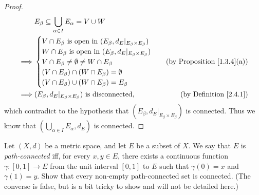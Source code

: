 \begin{proof}
    \begin{align*}
                 & E_\beta \subseteq \bigcup_{\alpha \in I} E_\alpha = V \cup W                                                        \\
        \implies & \begin{cases}
                       V \cap E_\beta \text{ is open in } (E_\beta, d_E|_{E_\beta \times E_\beta}) \\
                       W \cap E_\beta \text{ is open in } (E_\beta, d_E|_{E_\beta \times E_\beta}) \\
                       V \cap E_\beta \neq \emptyset \neq W \cap E_\beta                           \\
                       (V \cap E_\beta) \cap (W \cap E_\beta) = \emptyset                          \\
                       (V \cap E_\beta) \cup (W \cap E_\beta) = E_\beta
                   \end{cases} & \text{(by Proposition \ref{1.3.4}(a))}                                         \\
        \implies & (E_\beta, d_E|_{E_\beta \times E_\beta}) \text{ is disconnected},              & \text{(by Definition \ref{2.4.1})}
    \end{align*}
    which contradict to the hypothesis that \((E_\beta, d_E|_{E_\beta \times E_\beta})\) is connected.
    Thus we know that \((\bigcup_{\alpha \in I} E_\alpha, d_E)\) is connected.
\end{proof}

\begin{exercise}\label{ex 2.4.7}
    Let \((X, d)\) be a metric space, and let \(E\) be a subset of \(X\).
    We say that \(E\) is \emph{path-connected} iff, for every \(x, y \in E\), there exists a continuous function \(\gamma : [0, 1] \to E\) from the unit interval \([0, 1]\) to \(E\) such that \(\gamma(0) = x\) and \(\gamma(1) = y\).
    Show that every non-empty path-connected set is connected.
    (The converse is false, but is a bit tricky to show and will not be detailed here.)
\end{exercise}

